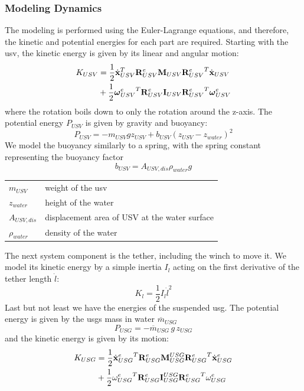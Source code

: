 \documentclass[a4paper,11pt]{article}
\newcommand{\Mat}[1]{\mathbf{\MakeUppercase{#1}}}
\renewcommand{\vec}[1]{\boldsymbol{\mathbf{\MakeLowercase{#1}}}}
\begin{document}
\subsubsection{Modeling Dynamics}

The modeling is performed using the Euler-Lagrange equations, and therefore, the kinetic and potential energies for each part are required. Starting with the \gls{usv}, the kinetic energy is given by its linear and angular motion:
\begin{align}
	K_{USV} &= \frac 1 2 \dot{\vec{x}}_{USV}^T {\Mat{R}_{USV}^{e}} \Mat{M}_{USV} {\Mat{R}_{USV}^{e}}^T \dot{\vec{x}}_{USV} \notag\\
	&+ \frac 1 2 {\vec{\omega}_{USV}^{e}}^T {\Mat{R}_{USV}^{e}} \Mat{I}_{USV} {\Mat{R}_{USV}^{e}}^T \vec{\omega}_{USV}^{e}
\end{align}
where the rotation boils down to only the rotation around the z-axis. The potential energy $P_{USV}$ is given by gravity and buoyancy:
\begin{equation}
	P_{USV} = - m_{USV} g z_{USV} + b_{USV} (z_{USV} - z_{water})^2
\end{equation}
We model the buoyancy similarly to a spring, with the spring constant representing the buoyancy factor
\begin{equation}
	b_{USV} = A_{USV, dis} \rho_{water} g
\end{equation}
\begin{tabular}{ll}
	$m_{USV}$		& weight of the \gls{usv}\\
	$z_{water}$		& height of the water\\
	$A_{USV, dis}$	& displacement area of USV at the water surface\\
	$\rho_{water}$	& density of the water \\
\end{tabular}

The next system component is the tether, including the winch to move it. We model its kinetic energy by a simple inertia $I_l$ acting on the first derivative of the tether length $\dot l$:
\begin{equation}
	K_l = \frac 1 2 I_l \dot l^2
\end{equation}
Last but not least we have the energies of the suspended \gls{usg}. The potential energy is given by the \gls{usg}s mass in water $\overline m_{USG}$
\begin{equation}
	P_{USG} = - \overline m_{USG} \,g \, z_{USG}
\end{equation}
and the kinetic energy is given by its motion:
\begin{align}
	K_{USG} &= \frac 1 2  \dot{\vec{x}}{_{USG}^e }^T {\Mat{R}_{USG}^{e}} \Mat{M}_{USG}^{USG} {\Mat{R}_{USG}^{e}}^T \dot{\vec{x}}_{USG}^e \notag\\
	&+ \frac 1 2 {\omega_{USG}^{e}}^T \Mat{R}_{USG}^{e} \Mat{I}_{USG}^{USG} {\Mat{R}_{USG}^{e}}^T \omega_{USG}^{e}
\end{align}
\end{document}
